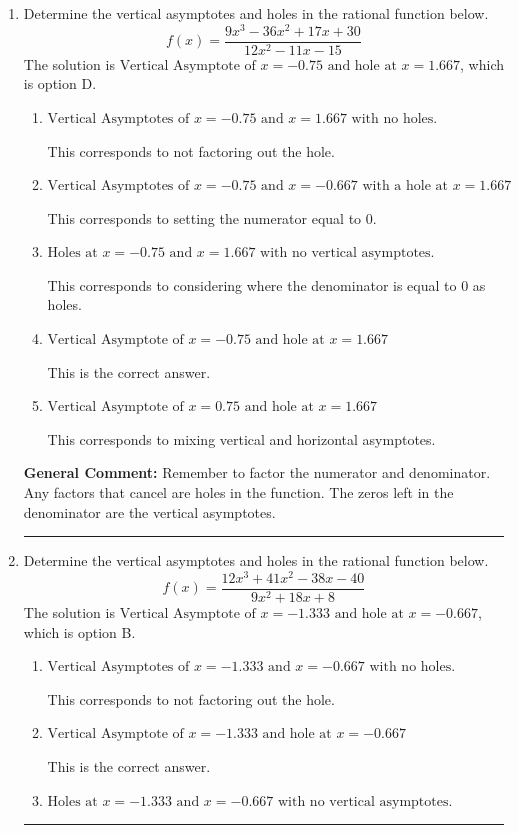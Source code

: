 \documentclass{extbook}[14pt]
\newcommand{\litem}[1]{\item #1

\rule{\textwidth}{0.4pt}}
\begin{document}
\begin{enumerate}\litem{
Determine the vertical asymptotes and holes in the rational function below.
\[ f(x) = \frac{9x^{3} -36 x^{2} +17 x + 30}{12x^{2} -11 x -15} \]The solution is \( \text{Vertical Asymptote of } x = -0.75 \text{ and hole at } x = 1.667 \), which is option D.\begin{enumerate}[label=\Alph*.]
\item \( \text{Vertical Asymptotes of } x = -0.75 \text{ and } x = 1.667 \text{ with no holes.} \)

This corresponds to not factoring out the hole.
\item \( \text{Vertical Asymptotes of } x = -0.75 \text{ and } x = -0.667 \text{ with a hole at } x = 1.667 \)

This corresponds to setting the numerator equal to 0.
\item \( \text{Holes at } x = -0.75 \text{ and } x = 1.667 \text{ with no vertical asymptotes.} \)

This corresponds to considering where the denominator is equal to 0 as holes.
\item \( \text{Vertical Asymptote of } x = -0.75 \text{ and hole at } x = 1.667 \)

This is the correct answer.
\item \( \text{Vertical Asymptote of } x = 0.75 \text{ and hole at } x = 1.667 \)

This corresponds to mixing vertical and horizontal asymptotes.
\end{enumerate}

\textbf{General Comment:} Remember to factor the numerator and denominator. Any factors that cancel are holes in the function. The zeros left in the denominator are the vertical asymptotes.
}
\litem{
Determine the vertical asymptotes and holes in the rational function below.
\[ f(x) = \frac{12x^{3} +41 x^{2} -38 x -40}{9x^{2} +18 x + 8} \]The solution is \( \text{Vertical Asymptote of } x = -1.333 \text{ and hole at } x = -0.667 \), which is option B.\begin{enumerate}[label=\Alph*.]
\item \( \text{Vertical Asymptotes of } x = -1.333 \text{ and } x = -0.667 \text{ with no holes.} \)

This corresponds to not factoring out the hole.
\item \( \text{Vertical Asymptote of } x = -1.333 \text{ and hole at } x = -0.667 \)

This is the correct answer.
\item \( \text{Holes at } x = -1.333 \text{ and } x = -0.667 \text{ with no vertical asymptotes.} \)


\end{enumerate}}
\end{enumerate}
\end{document}
